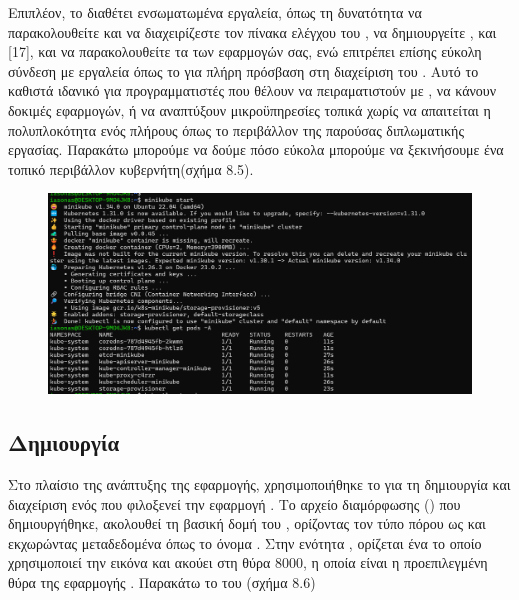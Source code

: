 Επιπλέον, το  
διαθέτει ενσωματωμένα εργαλεία, όπως τη δυνατότητα να παρακολουθείτε
και να διαχειρίζεστε τον πίνακα ελέγχου του , 
να δημιουργείτε , και [17], και 
να παρακολουθείτε τα  των εφαρμογών σας, ενώ επιτρέπει 
επίσης εύκολη σύνδεση με εργαλεία όπως το  
για πλήρη πρόσβαση στη διαχείριση του . 
Αυτό το καθιστά ιδανικό για προγραμματιστές που θέλουν να 
πειραματιστούν με , 
να κάνουν δοκιμές εφαρμογών, ή να αναπτύξουν μικροϋπηρεσίες 
τοπικά χωρίς να απαιτείται η πολυπλοκότητα ενός πλήρους 
όπως το περιβάλλον της παρούσας διπλωματικής εργασίας. Παρακάτω μπορούμε να δούμε 
πόσο εύκολα μπορούμε να ξεκινήσουμε ένα τοπικό περιβάλλον κυβερνήτη(σχήμα 8.5).


\begin{figure}[h]
	\centering
	\includegraphics[width=1.0\textwidth]{graphics/minikube_deployment_k8s.png}
	\caption{}
\end{figure}

\subsection{Δημιουργία }

Στο πλαίσιο της ανάπτυξης της εφαρμογής, χρησιμοποιήθηκε το 
 για τη δημιουργία και διαχείριση ενός  
που φιλοξενεί την εφαρμογή . Το αρχείο διαμόρφωσης 
() που δημιουργήθηκε, ακολουθεί τη βασική δομή του , 
ορίζοντας τον τύπο πόρου ως  και 
εκχωρώντας μεταδεδομένα όπως το όνομα . 
Στην ενότητα , ορίζεται ένα  
το οποίο χρησιμοποιεί την εικόνα  
και ακούει στη θύρα 8000, η οποία είναι η προεπιλεγμένη θύρα της 
εφαρμογής . Παρακάτω το  του (σχήμα 8.6)

